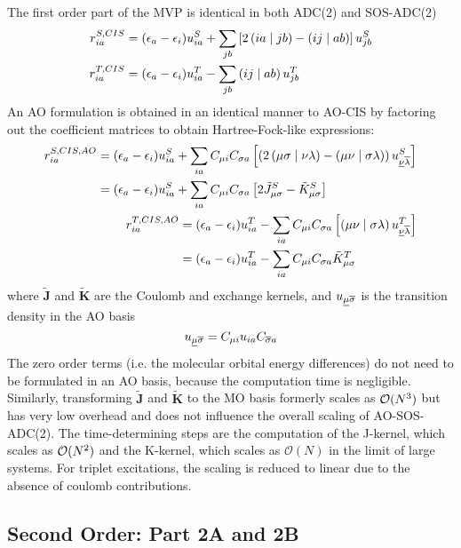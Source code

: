 The first order part of the MVP is identical in both ADC(2) and SOS-ADC(2)
\begin{align}
r_{ia}^{S,CIS} &= (\epsilon_a - \epsilon_i) u^S_{ia} + \sum_{jb} \left[ 2\left( ia \mid jb \right) - \left( ij \mid ab \right)\right] u^S_{jb} \\
r_{ia}^{T,CIS} &= (\epsilon_a - \epsilon_i) u^T_{ia} - \sum_{jb} \left( ij \mid ab \right) u^T_{jb} 
\end{align}
\noindent An AO formulation is obtained in an identical manner to AO-CIS by factoring out the coefficient matrices to obtain Hartree-Fock-like expressions:
\begin{align}
\begin{split}
r_{ia}^{S,CIS,AO} &= (\epsilon_a - \epsilon_i) u^S_{ia} + \sum_{ia} C_{\mu i} C_{\sigma a} \left[ \left( 2\left( \mu\sigma \mid \nu\lambda \right) - \left( \mu\nu \mid \sigma\lambda \right) \right) u^S_{\underline{\nu} \overline{\lambda}} \right] \\
&= (\epsilon_a - \epsilon_i) u^S_{ia} + \sum_{ia} C_{\mu i} C_{\sigma a} \left[ 2\tilde{J}^S_{\mu\sigma} - \tilde{K}^S_{\mu\sigma} \right]
\end{split}
\\
\begin{split}
r_{ia}^{T,CIS,AO} &= (\epsilon_a - \epsilon_i) u^T_{ia} - \sum_{ia} C_{\mu i} C_{\sigma a} \left[ \left( \mu\nu \mid \sigma\lambda \right) u^T_{\underline{\nu} \overline{\lambda}} \right] \\
&= (\epsilon_a - \epsilon_i) u^T_{ia} - \sum_{ia} C_{\mu i} C_{\sigma a} \tilde{K}^T_{\mu\sigma} 
\end{split}
\end{align}
\noindent where $\mathbf{\tilde{J}}$ and $\mathbf{\tilde{K}}$ are the Coulomb and exchange kernels, and $u_{\underline{\mu}\overline{\sigma}}$ is the transition density in the AO basis
\begin{equation}
u_{\underline{\mu}\overline{\sigma}} = C_{\mu i} u_{ia} C_{\overline{\sigma} a}
\end{equation}
\noindent The zero order terms (i.e. the molecular orbital energy differences) do not need to be formulated in an AO basis, because the computation time is negligible. Similarly, transforming $\mathbf{\tilde{J}}$ and $\mathbf{\tilde{K}}$ to the MO basis formerly scales as $\mathcal{O}(N^{3})$ but has very low overhead and does not influence the overall scaling of AO-SOS-ADC(2). The time-determining steps are the computation of the J-kernel, which scales as $\mathcal{O}(N^{2})$ and the K-kernel, which scales as $\mathcal{O}(N)$ in the limit of large systems. For triplet excitations, the scaling is reduced to linear due to the absence of coulomb contributions.

\subsection{Second Order: Part 2A and 2B}

